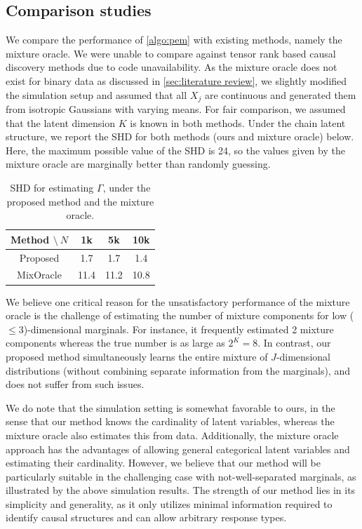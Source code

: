 \documentclass[10pt]{article} %
\begin{document}
\subsection{Comparison studies}\label{subsec:comparison}
We compare the performance of \cref{algo:pem} with existing methods, namely the mixture oracle. We were unable to compare against tensor rank based causal discovery methods \citep{chen2024learning,chen2025identification} due to code unavailability. As the mixture oracle does not exist for binary data as discussed in \cref{sec:literature review}, we slightly modified the simulation setup and assumed that all $X_j$ are continuous and generated them from isotropic Gaussians with varying means. For fair comparison, we assumed that the latent dimension $K$ is known in both methods. Under the chain latent structure, we report the SHD for both methods (ours and mixture oracle) below. Here, the maximum possible value of the SHD is 24, so the values given by the mixture oracle are marginally better than randomly guessing.
\begin{table}[h!]
    \centering
    \begin{tabular}{cccc}
        \toprule
         Method $\setminus ~N$ & 1k & 5k & 10k \\
        \midrule
        Proposed & 1.7 & 1.7 & 1.4 \\
        MixOracle & 11.4 & 11.2 & 10.8 \\
        \bottomrule
    \end{tabular}
%
    \caption{SHD for estimating $\Gamma$, under the proposed method and the mixture oracle.}
    \label{tab:mixoracle}
\end{table}

%
%
%
%
%



We believe one critical reason for the unsatisfactory performance of the mixture oracle is the challenge of estimating the number of mixture components for low ($\le 3$)-dimensional marginals. For instance, it frequently estimated 2 mixture components whereas the true number is as large as $2^K=8$. In contrast, our proposed method simultaneously learns the entire mixture of $J$-dimensional distributions (without combining separate information from the marginals), and does not suffer from such issues.

We do note that the simulation setting is somewhat favorable to ours, in the sense that our method knows the cardinality of latent variables, whereas the mixture oracle also estimates this from data. Additionally, the mixture oracle approach has the advantages of allowing general categorical latent variables and estimating their cardinality. However, we believe that our method will be particularly suitable in the challenging case with not-well-separated marginals, as illustrated by the above simulation results. The strength of our method lies in its simplicity and generality, as it only utilizes minimal information required to identify causal structures and can allow arbitrary response types.
\end{document}
